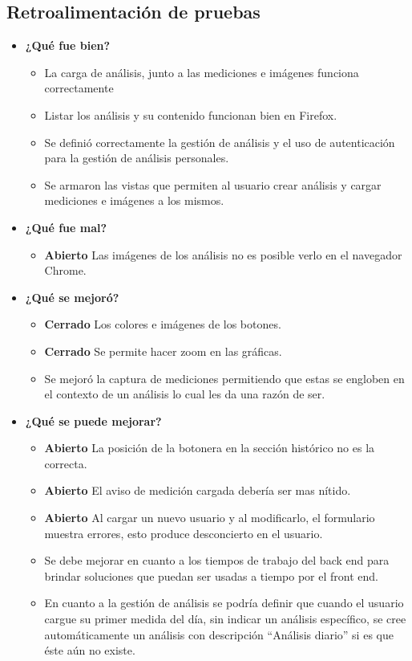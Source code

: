 \subsection{Retroalimentación de pruebas}
	\begin{itemize}
		\item \textbf{¿Qué fue bien?}
        	\begin{itemize}
				\item La carga de análisis, junto a las mediciones e imágenes funciona correctamente
				\item Listar los análisis y su contenido funcionan bien en Firefox.
				\item Se definió correctamente la gestión de análisis y el uso de autenticación para la gestión de análisis personales.
				\item Se armaron las vistas que permiten al usuario crear análisis y cargar mediciones e imágenes a los mismos.
			\end{itemize}
		\item \textbf{¿Qué fue mal?}
		\begin{itemize}
			\item \textbf{Abierto} Las imágenes de los análisis no es posible verlo en el navegador Chrome.
			
		\end{itemize}
   		\item \textbf{¿Qué se mejoró?}
        	\begin{itemize}
                \item \textbf{Cerrado} Los colores e imágenes de los botones.
                \item \textbf{Cerrado} Se permite hacer zoom en las gráficas.
                \item Se mejoró la captura de mediciones permitiendo que estas se engloben en el contexto de un análisis lo cual les da una razón de ser.
			\end{itemize}

   		\item \textbf{¿Qué se puede mejorar?}
        	\begin{itemize}
		       \item \textbf{Abierto} La posición de la botonera en la sección histórico no es la correcta.
		       \item \textbf{Abierto}  El aviso de medición cargada debería ser mas nítido.
		       \item \textbf{Abierto} Al cargar un nuevo usuario y al modificarlo, el formulario muestra errores, esto produce desconcierto en el usuario.
		        \item Se debe mejorar en cuanto a los tiempos de trabajo del back end para brindar soluciones que puedan ser usadas a tiempo por el front end.
		        \item En cuanto a la gestión de análisis se podría definir que cuando el usuario cargue su primer medida del día, sin indicar un análisis específico, se cree automáticamente un análisis con descripción ``Análisis diario'' si es que éste aún no existe.
            \end{itemize}
        

	\end{itemize}